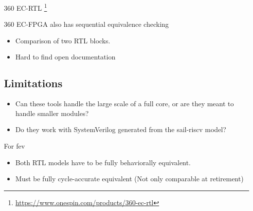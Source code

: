 360 EC-RTL \footnote{\url{https://www.onespin.com/products/360-ec-rtl}}

360 EC-FPGA also has sequential equivalence checking

\begin{itemize}
    \item Comparison of two RTL blocks.
    \item Hard to find open documentation
\end{itemize}


\subsection{Limitations}

\begin{itemize}
    \item Can these tools handle the large scale of a full core, or are they meant to handle smaller modules?
    \item Do they work with SystemVerilog generated from the sail-riscv model?
\end{itemize}

For \acrshort{fev}
\begin{itemize}
    \item Both RTL models have to be fully behaviorally equivalent.
    \item Must be fully cycle-accurate equivalent (Not only comparable at retirement)
\end{itemize}
